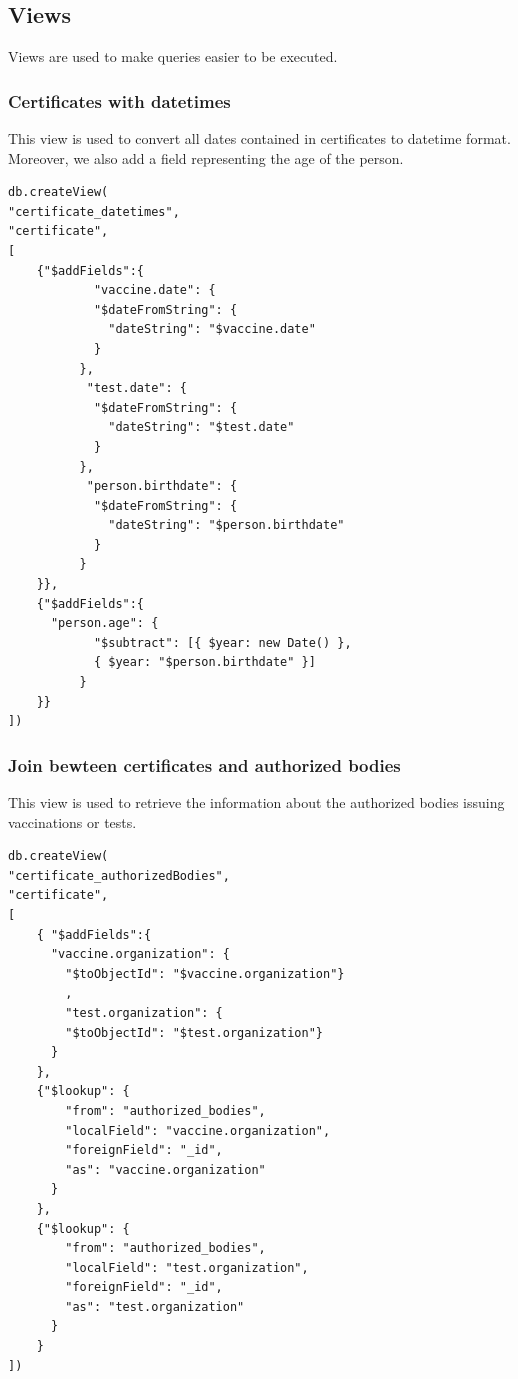 \documentclass[12pt, a4paper]{article}
\begin{document}
\subsection{Views}
Views are used to make queries easier to be executed.

\subsubsection{Certificates with datetimes}
This view is used to convert all dates contained in certificates to datetime format. 
Moreover, we also add a field representing the age of the person.

\begin{tcolorbox}[fontupper=\scriptsize]
    \begin{verbatim}
db.createView(
"certificate_datetimes", 
"certificate", 
[
	{"$addFields":{
	        "vaccine.date": {
	        "$dateFromString": {
	          "dateString": "$vaccine.date"
	        }
	      },	       
	       "test.date": {
	        "$dateFromString": {
	          "dateString": "$test.date"
	        }
	      },      
	       "person.birthdate": {
	        "$dateFromString": {
	          "dateString": "$person.birthdate"
	        }
	      }
	}},
	{"$addFields":{
	  "person.age": {
	        "$subtract": [{ $year: new Date() },
	        { $year: "$person.birthdate" }]
	      }
	}}
])
    \end{verbatim}
\end{tcolorbox}

\subsubsection{Join bewteen certificates and authorized bodies}
This view is used to retrieve the information about the authorized bodies issuing 
vaccinations or tests.
\begin{tcolorbox}[fontupper=\scriptsize]
    \begin{verbatim}
db.createView(
"certificate_authorizedBodies", 
"certificate", 
[
	{ "$addFields":{
	  "vaccine.organization": {
	    "$toObjectId": "$vaccine.organization"}
	    ,  
	    "test.organization": {
	    "$toObjectId": "$test.organization"}
	  }
	},
	{"$lookup": {
	    "from": "authorized_bodies",
	    "localField": "vaccine.organization",
	    "foreignField": "_id",
	    "as": "vaccine.organization"
	  }
	},
	{"$lookup": {
	    "from": "authorized_bodies",
	    "localField": "test.organization",
	    "foreignField": "_id",
	    "as": "test.organization"
	  }
	}
])
    \end{verbatim}
\end{tcolorbox}
\end{document}
